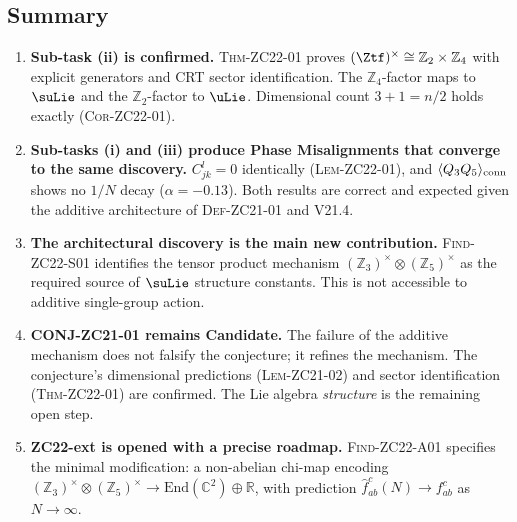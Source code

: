 \documentclass[12pt, a4paper]{article}
\begin{document}
\subsection{Summary}
\label{zc22:sec:summary}

\begin{enumerate}[leftmargin=*, label=\arabic*., noitemsep]

\item \textbf{Sub-task (ii) is confirmed.}
  \textsc{Thm-ZC22-01} proves $(\Ztf)^\times \cong \mathbb{Z}_2\times\mathbb{Z}_4$
  with explicit generators and CRT sector identification.
  The $\mathbb{Z}_4$-factor maps to $\suLie$ and the $\mathbb{Z}_2$-factor to $\uLie$.
  Dimensional count $3+1 = n/2$ holds exactly (\textsc{Cor-ZC22-01}).

\item \textbf{Sub-tasks (i) and (iii) produce Phase Misalignments
  that converge to the same discovery.}
  $C_{jk}^l = 0$ identically (\textsc{Lem-ZC22-01}),
  and $\langle Q_3 Q_5\rangle_{\rm conn}$ shows no $1/N$ decay
  ($\alpha = -0.13$).
  Both results are correct and expected given the additive architecture
  of \textsc{Def-ZC21-01} and V21.4.

\item \textbf{The architectural discovery is the main new contribution.}
  \textsc{Find-ZC22-S01} identifies the tensor product mechanism
  $(\mathbb{Z}_3)^\times \otimes (\mathbb{Z}_5)^\times$ as the
  required source of $\suLie$ structure constants.
  This is not accessible to additive single-group action.

\item \textbf{CONJ-ZC21-01 remains Candidate.}
  The failure of the additive mechanism does not falsify the conjecture;
  it refines the mechanism.
  The conjecture's dimensional predictions (\textsc{Lem-ZC21-02})
  and sector identification (\textsc{Thm-ZC22-01}) are confirmed.
  The Lie algebra \emph{structure} is the remaining open step.

\item \textbf{ZC22-ext is opened with a precise roadmap.}
  \textsc{Find-ZC22-A01} specifies the minimal modification:
  a non-abelian chi-map encoding
  $(\mathbb{Z}_3)^\times \otimes (\mathbb{Z}_5)^\times \to \mathrm{End}(\mathbb{C}^2)\oplus\mathbb{R}$,
  with prediction $\hat{f}_{ab}^c(N) \to f_{ab}^c$ as $N\to\infty$.

\end{enumerate}
\end{document}
